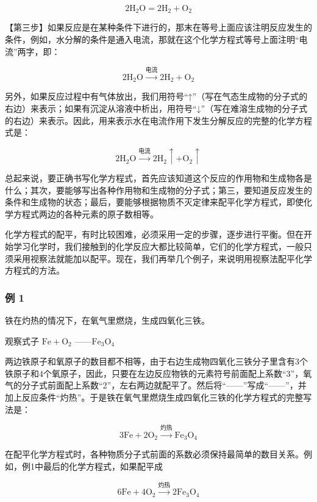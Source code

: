 \[
2 \mathrm{H}_{2} \mathrm{O} = 2 \mathrm{H}_{2} + \mathrm{O}_{2}
\]

【第三步】如果反应是在某种条件下进行的，那末在等号上面应该注明反应发生的条件，例如，水分解的条件是通入电流，那就在这个化学方程式等号上面注明``电流''两字，即：

\[
2 \mathrm{H}_{2} \mathrm{O} \xrightarrow {\text{电流}} 2 \mathrm{H}_{2} + \mathrm{O}_{2}
\]

另外，如果反应过程中有气体放出，我们用符号``↑''（写在气态生成物的分子式的右边）来表示；如果有沉淀从溶液中析出，用符号``↓''（写在难溶生成物的分子式的右边）来表示。因此，用来表示水在电流作用下发生分解反应的完整的化学方程式是：

\[
2 \mathrm{H}_{2} \mathrm{O} \xrightarrow {\text{电流}} 2 \mathrm{H}_{2} \uparrow + \mathrm{O}_{2} \uparrow
\]

总起来说，要正确书写化学方程式，首先应该知道这个反应的作用物和生成物各是什么；其次，要能够写出各种作用物和生成物的分子式；第三，要知道反应发生的条件和生成物的状态；最后，要能够根据物质不灭定律来配平化学方程式，即使化学方程式两边的各种元素的原子数相等。

化学方程式的配平，有时比较困难，必须采用一定的步骤，逐步进行平衡。但在开始学习化学时，我们接触到的化学反应大都比较简单，它们的化学方程式，一般只须采用视察法就能加以配平。现在，我们再举几个例子，来说明用视察法配平化学方程式的方法。

\subsubsection{例 1}

铁在灼热的情况下，在氧气里燃烧，生成四氧化三铁。

观察式子 \(\mathrm{Fe} + \mathrm{O}_2\)
------\(\mathrm{Fe}_3\mathrm{O}_4\)

两边铁原子和氧原子的数目都不相等，由于右边生成物四氧化三铁分子里含有3个铁原子和4个氧原子，因此，只要在左边反应物铁的元素符号前面配上系数``3''，氧气的分子式前面配上系数``2''，左右两边就配平了。然后将``------''写成``------''，并加上反应条件``灼热''。于是铁在氧气里燃烧生成四氧化三铁的化学方程式的完整写法是：

\[
3 \mathrm{Fe} + 2 \mathrm{O}_{2} \xrightarrow {\text{灼热}} \mathrm{Fe}_{3} \mathrm{O}_{4}
\]

在配平化学方程式时，各种物质分子式前面的系数必须保持最简单的数目关系。例如，例1中最后的化学方程式，如果配平成

\[
6 \mathrm{Fe} + 4 \mathrm{O}_{2} \xrightarrow {\text{灼热}} 2 \mathrm{Fe}_{3} \mathrm{O}_{4}
\]

